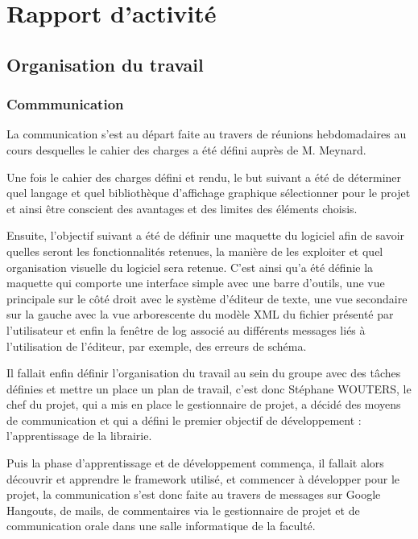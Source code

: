 \chapter{Rapport d'activité}

\section{Organisation du travail}
        
        \subsection{Commmunication}
        La communication s'est au départ faite au travers de réunions hebdomadaires au cours desquelles le cahier des charges a été défini auprès de M. Meynard.
        
        Une fois le cahier des charges défini et rendu, le but suivant a été de déterminer quel langage et quel bibliothèque d'affichage graphique sélectionner pour le projet et ainsi être conscient des avantages et des limites des éléments choisis.
        
        Ensuite, l'objectif suivant a été de définir une maquette du logiciel afin de savoir quelles seront les fonctionnalités retenues, la manière de les exploiter et quel organisation visuelle du logiciel sera retenue. C'est ainsi qu'a été définie la maquette qui comporte une interface simple avec une barre d'outils, une vue principale sur le côté droit avec le système d'éditeur de texte, une vue secondaire sur la gauche avec la vue arborescente du modèle XML du fichier présenté par l'utilisateur et enfin la fenêtre de log associé au différents messages liés à l'utilisation de l'éditeur, par exemple, des erreurs de schéma.
        
        Il fallait enfin définir l'organisation du travail au sein du groupe avec des tâches définies et mettre un place un plan de travail, c'est donc Stéphane WOUTERS, le chef du projet, qui a mis en place le gestionnaire de projet, a décidé des moyens de communication et qui a défini le premier objectif de développement : l'apprentissage de la librairie.
        
        Puis la phase d'apprentissage et de développement commença, il fallait alors découvrir et apprendre le framework utilisé, et commencer à développer pour le projet, la communication s'est donc faite au travers de messages sur Google Hangouts, de mails, de commentaires via le gestionnaire de projet et de communication orale dans une salle informatique de la faculté.
        
